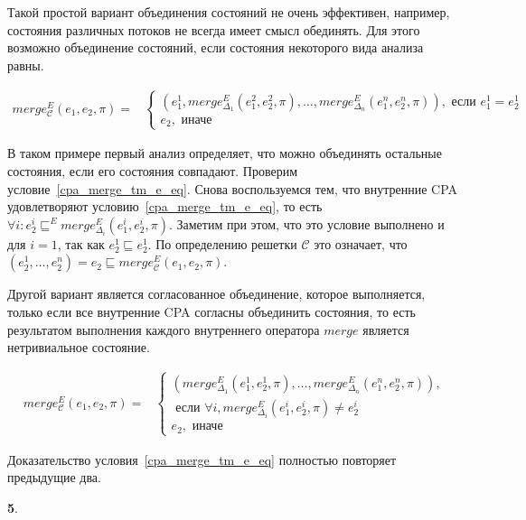 Такой простой вариант объединения состояний не очень эффективен, например, состояния различных потоков не всегда имеет смысл обединять.
Для этого возможно объединение состояний, если состояния некоторого вида анализа равны. 

\begin{align}
merge^E_{\mathscr{C}}(e_1,e_2,\pi) =
& \begin{cases}
(e_1^1, merge^E_{\Delta_1}(e_1^2, e_2^2,\pi), \dots, merge^E_{\Delta_n}(e_1^n, e_2^n,\pi)), \mbox{ если } e_1^1 = e_2^1 \\
e_2, \mbox{ иначе }
\end{cases} \nonumber
\end{align}

В таком примере первый анализ определяет, что можно объединять остальные состояния, если его состояния совпадают.
Проверим условие~\ref{cpa_merge_tm_e_eq}.
Снова воспользуемся тем, что внутренние CPA удовлетворяют условию~\ref{cpa_merge_tm_e_eq}, то есть $\forall i: e_2^i \sqsubseteq^E merge^E_{\Delta_i}(e_1^i, e_2^i,\pi)$.
Заметим при этом, что это условие выполнено и для $i = 1$, так как $e_2^1 \sqsubseteq e_2^1$.
По определению решетки $\mathscr{C}$ это означает, что $(e_2^1, \dots, e_2^n) = e_2 \sqsubseteq merge^E_{\mathscr{C}}(e_1,e_2,\pi)$.

Другой вариант является согласованное объединение, которое выполняется, только если все внутренние CPA согласны объединить состояния, то есть результатом выполнения каждого внутреннего оператора $merge$ является нетривиальное состояние.

\begin{align}
merge^E_{\mathscr{C}}(e_1,e_2,\pi) =
& \begin{cases}
(merge^E_{\Delta_1}(e_1^1, e_2^1,\pi), \dots, merge^E_{\Delta_n}(e_1^n, e_2^n,\pi)),\\
\mbox{ если } \forall i, merge^E_{\Delta_i}(e_1^i, e_2^i,\pi) \neq e_2^i \\
e_2, \mbox{ иначе }
\end{cases} \nonumber
\end{align}

Доказательство условия~\ref{cpa_merge_tm_e_eq} полностью повторяет предыдущие два.

{\textbf 5.}

